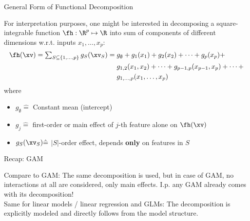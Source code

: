 \documentclass[11pt,compress,t,notes=noshow, aspectratio=169, xcolor=table]{beamer}
\newcommand{\open}{}
\newcommand{\close}{}
\begin{document}
\begin{frame}{General Form of Functional Decomposition
}

For interpretation purposes, one might be interested in decomposing a square-integrable function $\fh: \R^p \mapsto \R$ into sum of components of different dimensions w.r.t. inputs $x_1, \ldots, x_p$: %
\begin{equation*}
\begin{split}
\fh(\xv) =  %
\textstyle\sum_{S \subseteq \{1,\ldots,p\}} g_{S}(\xv_S) = \; & g_{\open \emptyset \close} + g_{\open 1 \close}(x_1) + g_{\open 2 \close}(x_2) + \dots + g_{\open p \close}(x_p) + \\
& g_{\open 1, 2 \close}(x_1, x_2) + \dots + g_{\open p-1, p \close}(x_{p-1}, x_p) + \dots + \\
& g_{\open 1,\ldots,p \close}(x_1, \ldots, x_p)
\end{split}
\end{equation*}
where 
\begin{itemize}
\item $g_{\open \emptyset \close} \hat = $ Constant mean (intercept) %
\item $g_{\open j \close} \hat = $ first-order or main effect of $j$-th feature alone on $\fh(\xv)$
\item $g_{S}(\xv_S) \hat = $ $|S|$-order effect, depends \textbf{only} on features in $S$ %
\end{itemize}
\lz

\end{frame}

\begin{frame}{Recap: GAM}

    Compare to GAM: The same decomposition is used, but in case of GAM, no interactions at all are considered, only main effects. I.p. any GAM already comes with its decomposition! \\
    Same for linear models / linear regression and GLMs: The decomposition is explicitly modeled and directly follows from the model structure.
    
\end{frame}
\end{document}
